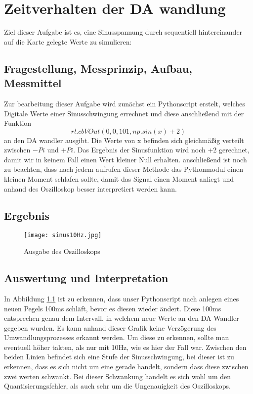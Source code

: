 %
%
\chapter{Zeitverhalten der DA wandlung}
Ziel dieser Aufgabe ist es, eine Sinusspannung durch sequentiell hintereinander auf die Karte gelegte Werte zu simulieren:
\label{chap:ZeitverhaltenDA}
\section{Fragestellung, Messprinzip, Aufbau, Messmittel}
\label{chap:VERSUCH_4_FRAGESTELLUNG}
Zur bearbeitung dieser Aufgabe wird zunächst ein Pythonscript erstelt, welches Digitale Werte einer Sinusschwingung errechnet und diese anschließend mit der Funktion \begin{equation}
rl.cbVOut(0,0,101,np.sin(x)+2)
\end{equation}
an den DA wandler ausgibt. Die Werte von x befinden sich gleichmäßig verteilt zwischen $-Pi$ und $+Pi$. Das Ergebnis der Sinusfunktion wird noch +2 gerechnet, damit wir in keinem Fall einen Wert kleiner Null erhalten. anschließend ist noch zu beachten, dass nach jedem aufrufen dieser Methode das Pythonmodul einen kleinen Moment schlafen sollte, damit das Signal einen Moment anliegt und anhand des Oszilloskop besser interpretiert werden kann.
\section{Ergebnis}
\label{chap:VERSUCH_4_MESSWERTE}

\begin{figure}[H]
\centering
\texttt{[image: sinus10Hz.jpg]}
\caption{Ausgabe des Oszilloskops}
\label{fig:Oszi}
\end{figure}


\section{Auswertung und Interpretation}
\label{chap:V4_AUSWERTUNGUNDINTERPRETATION}
In Abbildung \ref{fig:Oszi} ist zu erkennen, dass unser Pythonscript nach anlegen eines neuen Pegels 100ms schläft, bevor es diesen wieder ändert. Diese 100ms entsprechen genau dem Intervall, in welchem neue Werte an den DA-Wandler gegeben wurden. Es kann anhand dieser Grafik keine Verzögerung des Umwandlungsprozesses erkannt werden.
Um diese zu erkennen, sollte man eventuell höher takten, als nur mit 10Hz, wie es hier der Fall war.
Zwischen den beiden Linien befindet sich eine Stufe der Sinusschwingung, bei dieser ist zu erkennen, dass es sich nicht um eine  gerade handelt, sondern dass diese zwischen zwei werten schwankt. Bei dieser Schwankung handelt es sich wohl um den Quantisierungsfehler, als auch sehr um die Ungenauigkeit des Oszilloskops.
